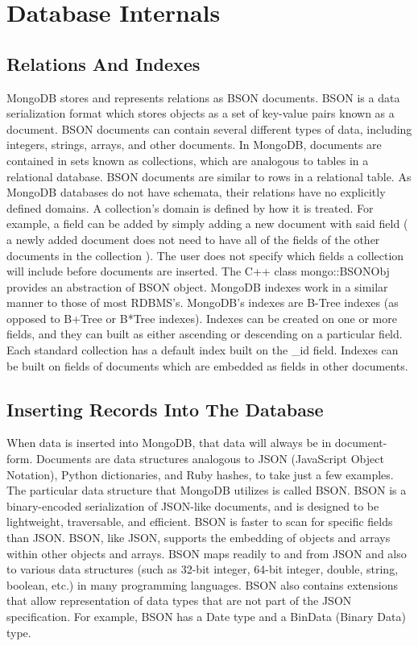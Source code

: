 \documentclass{dependencies/acm_proc_article-sp}
\begin{document}
\section{Database Internals}
\subsection{Relations And Indexes}
MongoDB stores and represents relations as BSON documents\cite{1}.
BSON is a data serialization format which stores objects as a set of key-value pairs known as a document.
BSON documents can contain several different types of data, including integers, strings, arrays, and other documents\cite{2}.
In MongoDB, documents are contained in sets known as collections, which are analogous to tables in a relational database\cite{3}.
BSON documents are similar to rows in a relational table.
As MongoDB databases do not have schemata, their relations have no explicitly defined domains.
A collection's domain is defined by how it is treated.
For example, a field can be added by simply adding a new document with said field ( a newly added document does not need to have all of the fields of the other documents in the collection ).
The user does not specify which fields a collection will include before documents are inserted\cite{4}.
The C++ class mongo::BSONObj provides an abstraction of BSON object\cite{5}.
MongoDB indexes work in a similar manner to those of most RDBMS's.
MongoDB's indexes are B-Tree indexes (as opposed to B+Tree or B*Tree indexes).
Indexes can be created on one or more fields, and they can built as either ascending or descending on a particular field.
Each standard collection has a default index built on the \_id field.  Indexes can be built on fields of documents which are embedded as fields in other documents\cite{6}.
\subsection{Inserting Records Into The Database}
When data is inserted into MongoDB, that data will always be in document-form.
Documents are data structures analogous to JSON (JavaScript Object Notation), Python dictionaries, and Ruby hashes, to take just a few examples.
The particular data structure that MongoDB utilizes is called BSON.
BSON is a binary-encoded serialization of JSON-like documents, and is designed to be lightweight, traversable, and efficient.
BSON is faster to scan for specific fields than JSON.
BSON, like JSON, supports the embedding of objects and arrays within other objects and arrays.
BSON maps readily to and from JSON and also to various data structures (such as 32-bit integer, 64-bit integer, double, string, boolean, etc.) in many programming languages.
BSON also contains extensions that allow representation of data types that are not part of the JSON specification.
For example, BSON has a Date type and a BinData (Binary Data) type.
\end{document}
